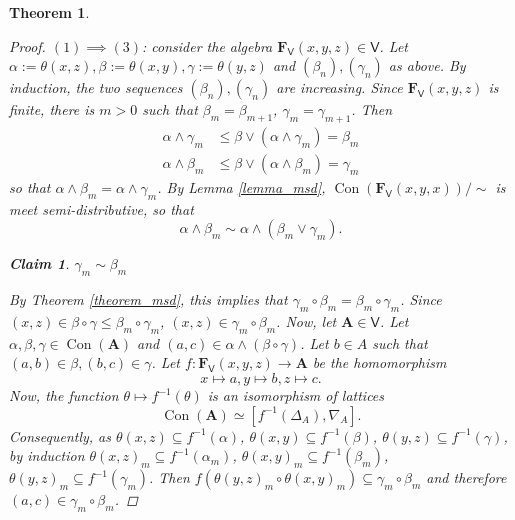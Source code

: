 \documentclass{amsart}
\theoremstyle{plain}
\newtheorem{theorem}{Theorem}[section]
\newtheorem{claim}{Claim}
\theoremstyle{definition}
\theoremstyle{remark}
\DeclareMathOperator{\Con}{Con}
\begin{document}
\begin{theorem}
\begin{proof}
        $(1) \implies (3)$: consider the algebra $\mathbf{F}_{\mathsf{V}}(x,y,z) \in \mathsf{V}$. 
        Let $\alpha:=\theta(x,z), \beta:=\theta(x,y), \gamma:=\theta(y,z)$ and $(\beta_n), (\gamma_n)$ as above. 
        By induction, the two sequences $(\beta_n), (\gamma_n)$ are increasing. 
        Since $\mathbf{F}_{\mathsf{V}}(x,y,z)$ is finite, there is $m > 0$ such that $\beta_m = \beta_{m+1}$, $\gamma_m = \gamma_{m+1}$. 
        Then 
        \begin{align*}
            \alpha \land \gamma_m & \le \beta \lor (\alpha \land \gamma_m) = \beta_m \\
            \alpha \land \beta_m & \le \beta \lor (\alpha \land \beta_m) = \gamma_m
        \end{align*}
        so that $\alpha \land \beta_m = \alpha \land \gamma_m$. 
        By Lemma \ref{lemma_msd}, $\Con(\mathbf{F}_{\mathsf{V}}(x,y,x))/ \sim$ is meet semi-distributive, so that 
        \begin{equation*}
            \alpha \land \beta_m \sim \alpha \land (\beta_m \lor \gamma_m) \text{.}
        \end{equation*}
        \begin{claim}
            $\gamma_m \sim \beta_m$ 
        \end{claim}
        By Theorem \ref{theorem_msd}, this implies that $\gamma_m \circ \beta_m = \beta_m \circ \gamma_m$. 
        Since $(x,z) \in \beta \circ \gamma \le \beta_m \circ \gamma_m$, $(x,z) \in \gamma_m \circ \beta_m$.
        Now, let $\mathbf{A} \in \mathsf{V}$. 
        Let $\alpha, \beta, \gamma \in \Con(\mathbf{A})$ and $(a,c) \in \alpha \land (\beta \circ \gamma)$. 
        Let $b \in A$ such that $(a,b) \in \beta, (b,c) \in \gamma$. 
        Let $f: \mathbf{F}_{\mathsf{V}}(x,y,z) \to \mathbf{A}$ be the homomorphism
        \begin{equation*}
            x \mapsto a, y \mapsto b, z \mapsto c \text{.}
        \end{equation*} 
        Now, the function $\theta \mapsto f^{-1}(\theta)$ is an isomorphism of lattices 
        \begin{equation*}
            \Con(\mathbf{A}) \simeq [f^{-1}(\Delta_A), \nabla_A] \text{.}
        \end{equation*}
        Consequently, as $\theta(x,z) \subseteq f^{-1}(\alpha)$, $\theta(x,y) \subseteq f^{-1}(\beta)$, $\theta(y,z) \subseteq f^{-1}(\gamma)$, by induction  
        $\theta(x,z)_m \subseteq f^{-1}(\alpha_m)$, $\theta(x,y)_m \subseteq f^{-1}(\beta_m)$, $\theta(y,z)_m \subseteq f^{-1}(\gamma_m)$.
        Then $f(\theta(y,z)_m \circ \theta(x,y)_m) \subseteq \gamma_m \circ \beta_m$ and therefore $(a,c) \in \gamma_m \circ \beta_m$. 


\end{proof}
\end{theorem}
\end{document}
